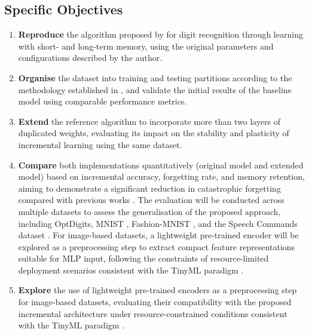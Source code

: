     \subsection{Specific Objectives}
        \begin{enumerate}
            \item \textbf{Reproduce} the algorithm proposed by \cite{bullinaria2009} for digit recognition through learning with short- and long-term memory, using the original parameters and configurations described by the author.
            
            \item \textbf{Organise} the dataset into training and testing partitions according to the methodology established in \cite{bullinaria2009}, and validate the initial results of the baseline model using comparable performance metrics.
            
            \item \textbf{Extend} the reference algorithm to incorporate more than two layers of duplicated weights, evaluating its impact on the stability and plasticity of incremental learning using the same dataset.
            
            \item \textbf{Compare} both implementations quantitatively (original model and extended 
model) based on incremental accuracy, forgetting rate, and memory retention, aiming to 
demonstrate a significant reduction in catastrophic forgetting compared with previous 
works \cite{de2021continual, kirkpatrick2017overcoming}. The evaluation will be conducted 
across multiple datasets to assess the generalisation of the proposed approach, including 
OptDigits, MNIST \cite{lecun1998mnist}, Fashion-MNIST \cite{xiao2017fashionmnist}, and 
the Speech Commands dataset \cite{warden2018speech}. For image-based datasets, a 
lightweight pre-trained encoder will be explored as a preprocessing step to extract compact 
feature representations suitable for MLP input, following the constraints of 
resource-limited deployment scenarios consistent with the TinyML paradigm 
\cite{warden2019tinyml}.
            \item \textbf{Explore} the use of lightweight pre-trained encoders as a preprocessing 
step for image-based datasets, evaluating their compatibility with the proposed 
incremental architecture under resource-constrained conditions consistent with the 
TinyML paradigm \cite{warden2019tinyml}.
        \end{enumerate}
